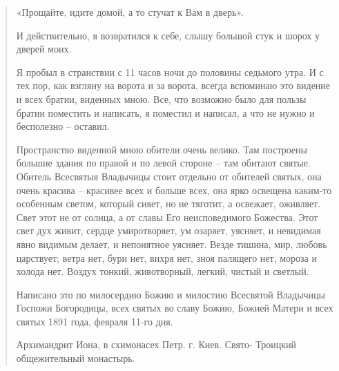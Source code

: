 \begin{quotation}

«Прощайте, идите домой, а то стучат к Вам в дверь».

И действительно, я возвратился к себе, слышу большой стук и шорох у дверей моих.

Я пробыл в странствии с 11 часов ночи до половины седьмого утра. И с тех пор, как взгляну на ворота и за ворота, всегда вспоминаю это видение и всех братии, виденных мною. Все, что возможно было для пользы братии поместить и написать,  я поместил и написал, а что не нужно и бесполезно – оставил.

Пространство виденной мною обители очень велико. Там построены большие здания по правой и по левой стороне – там обитают святые. Обитель Всесвятыя Владычицы стоит отдельно от обителей святых, она очень красива – красивее всех и больше всех, она ярко освещена каким-то особенным светом, который сияет, но не тяготит, а освежает, оживляет. Свет этот не от солнца, а от славы Его неисповедимого Божества. Этот свет дух живит, сердце умиротворяет, ум озаряет, уясняет, и невидимая явно видимым делает, и непонятное уясняет. Везде тишина, мир, любовь царствует; ветра нет, бури нет, вихря нет, зноя палящего нет, мороза и холода нет. Воздух тонкий, животворный, легкий, чистый и светлый. 


Написано это по милосердию Божию и милостию Всесвятой Владычицы Госпожи Богородицы, всех святых во славу Божию, Божией Матери и всех святых 1891 года, февраля 11-го дня.

Архимандрит Иона, в схимонасех Петр. г. Киев. Свято- Троицкий общежительный монастырь.
\end{quotation}

